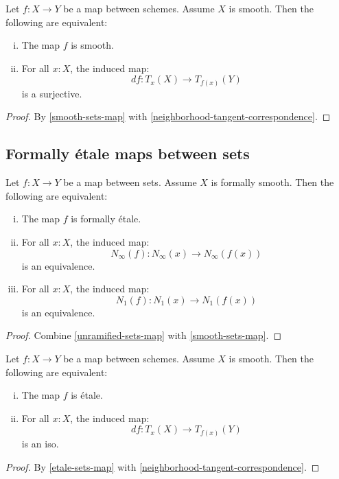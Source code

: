 \begin{corollary}
Let $f:X\to Y$ be a map between schemes. Assume $X$ is smooth. Then the following are equivalent:
\begin{enumerate}[(i)]
\item The map $f$ is smooth. 
\item For all $x:X$, the induced map:
\[df : T_x(X)\to T_{f(x)}(Y)\]
is a surjective.
\end{enumerate}
\end{corollary}

\begin{proof}
By \cref{smooth-sets-map} with \cref{neighborhood-tangent-correspondence}.
\end{proof}

\subsection{Formally étale maps between sets}

\begin{proposition}\label{etale-sets-map}
Let $f:X\to Y$ be a map between sets. Assume $X$ is formally smooth. Then the following are equivalent:
\begin{enumerate}[(i)]
\item The map $f$ is formally étale. 
\item For all $x:X$, the induced map:
\[N_\infty(f) : N_\infty(x)\to N_\infty(f(x))\]
is an equivalence.
\item For all $x:X$, the induced map:
\[N_1(f) : N_1(x)\to N_1(f(x))\]
is an equivalence.
\end{enumerate}
\end{proposition}

\begin{proof}
Combine \cref{unramified-sets-map} with \cref{smooth-sets-map}.
\end{proof}

\begin{corollary}
Let $f:X\to Y$ be a map between schemes. Assume $X$ is smooth. Then the following are equivalent:
\begin{enumerate}[(i)]
\item The map $f$ is étale. 
\item For all $x:X$, the induced map:
\[df : T_x(X)\to T_{f(x)}(Y)\]
is an iso.
\end{enumerate}
\end{corollary}

\begin{proof}
By \cref{etale-sets-map}  with \cref{neighborhood-tangent-correspondence}.
\end{proof}

